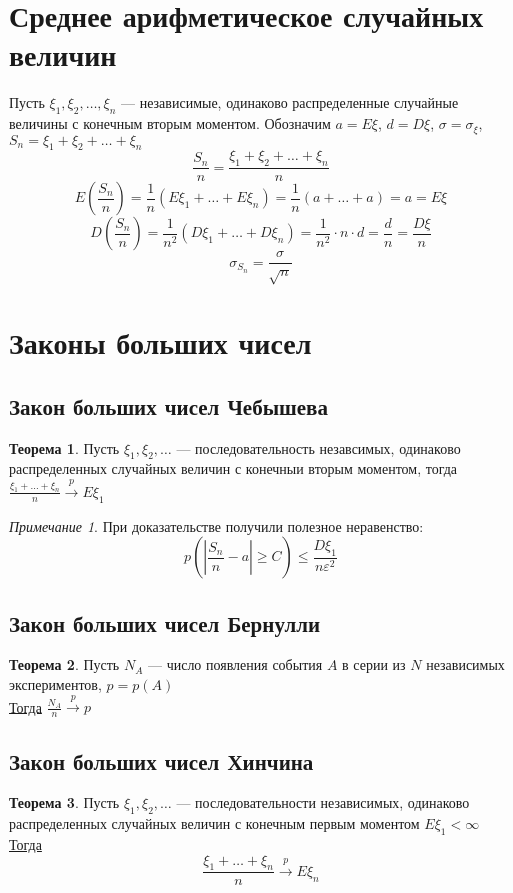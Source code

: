 \documentclass[english]{article}
\theoremstyle{plain}
\theoremstyle{remark}
\newtheorem*{remark}{Примечание}
\theoremstyle{definition}
\newtheorem{theorem}{Теорема}[section]
\begin{document}
\section{Среднее арифметическое случайных величин}
\label{sec:orgb80163e}
Пусть \(\xi_1, \xi_2, \dots, \xi_n\) --- независимые, одинаково распределенные случайные величины с конечным вторым моментом. Обозначим \(a = E\xi\), \(d = D\xi\), \(\sigma = \sigma_{\xi}\), \(S_n = \xi_1 + \xi_2 + \dots + \xi_n\)
\[ \frac{S_n}{n} = \frac{\xi_1 + \xi_2 + \dots + \xi_n}{n} \]
\[ E \left(\frac{S_n}{n}\right) = \frac{1}{n}(E\xi_1 + \dots + E\xi_n) = \frac{1}{n}(a + \dots + a) = a = E\xi \]
\[ D \left(\frac{S_n}{n}\right) = \frac{1}{n^2}(D\xi_1 + \dots + D\xi_n) = \frac{1}{n^2} \cdot n \cdot d = \frac{d}{n} = \frac{D\xi}{n} \]
\[ \sigma_{S_n} = \frac{\sigma}{\sqrt{n}} \]
\section{Законы больших чисел}
\label{sec:orgafe89cf}
\subsection{Закон больших чисел Чебышева}
\label{sec:orge93c244}
\begin{theorem}
Пусть \(\xi_1, \xi_2, \dots\) --- последовательность незавсимых, одинаково распределенных случайных величин с конечныи вторым моментом, тогда \(\frac{\xi_1 + \dots + \xi_n}{n} \xrightarrow{p} E\xi_1\)
\end{theorem}
\begin{remark}
При доказательстве получили полезное неравенство:
\[ p \left(\left|\frac{S_n}{n} - a \right| \ge C\right) \le \frac{D\xi_1}{n \varepsilon^2} \]
\end{remark}
\subsection{Закон больших чисел Бернулли}
\label{sec:org03c9113}
\begin{theorem}
Пусть \(N_A\) --- число появления события \(A\) в серии из \(N\) независимых экспериментов, \(p = p(A)\) \\
\uline{Тогда} \(\frac{N_A}{n} \xrightarrow{p} p\) 
\end{theorem}
\subsection{Закон больших чисел Хинчина}
\label{sec:org4d2f0d5}
\begin{theorem}
Пусть \(\xi_1, \xi_2, \dots\) --- последовательности независимых, одинаково распределенных случайных величин с конечным первым моментом \(E\xi_1 < \infty\) \\
\uline{Тогда} \[ \frac{\xi_1 + \dots + \xi_n}{n} \xrightarrow{p} E\xi_n \]
\label{org572e196}
\end{theorem}
\end{document}

